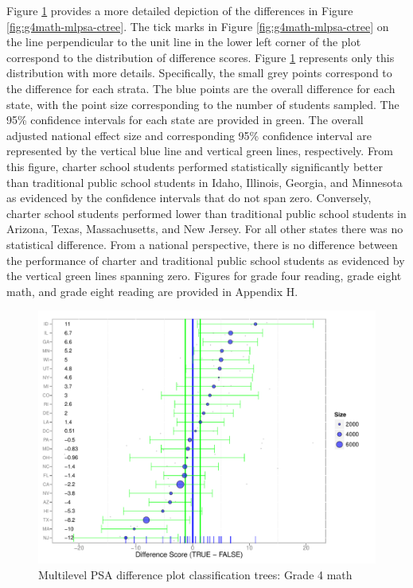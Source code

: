 \documentclass[letterpaper,12p,twoside]{article} %
\begin{document}
Figure \ref{fig:g4math-mlpsa-ctree-diff} provides a more detailed depiction of the differences in Figure \ref{fig:g4math-mlpsa-ctree}. The tick marks in Figure \ref{fig:g4math-mlpsa-ctree} on the line perpendicular to the unit line in the lower left corner of the plot correspond to the distribution of difference scores. Figure \ref{fig:g4math-mlpsa-ctree-diff} represents only this distribution with more details. Specifically, the small grey points correspond to the difference for each strata. The blue points are the overall difference for each state, with the point size corresponding to the number of students sampled. The 95\% confidence intervals for each state are provided in green. The overall adjusted national effect size and corresponding 95\% confidence interval are represented by the vertical blue line and vertical green lines, respectively. From this figure, charter school students performed statistically significantly better than traditional public school students in Idaho, Illinois, Georgia, and Minnesota as evidenced by the confidence intervals that do not span zero. Conversely, charter school students performed lower than traditional public school students in Arizona, Texas, Massachusetts, and New Jersey. For all other states there was no statistical difference. From a national perspective, there is no difference between the performance of charter and traditional public school students as evidenced by the vertical green lines spanning zero. Figures for grade four reading, grade eight math, and grade eight reading are provided in Appendix H.

\begin{figure}[t]
\begin{center}
\includegraphics[width=\textwidth]{../Figures2009/g4math-mlpsa-ctree-diff.pdf}
\caption{Multilevel PSA difference plot classification trees: Grade 4 math}
\label{fig:g4math-mlpsa-ctree-diff}
\end{center}
\end{figure}
\end{document}
